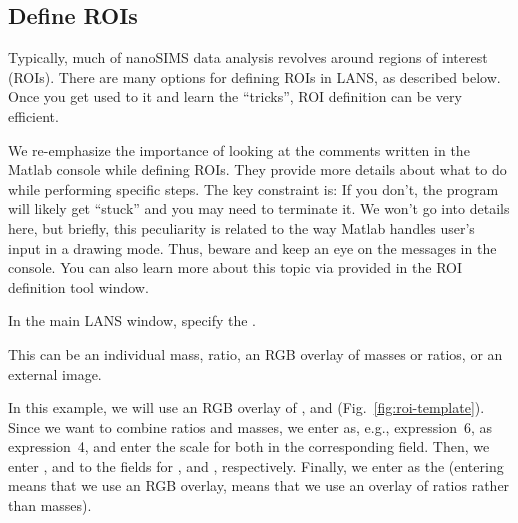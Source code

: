 
\subsection{Define ROIs}
\setcounter{step}{0}

\goldbox{}
Typically, much of nanoSIMS data analysis revolves around regions of interest (ROIs). There are many options for defining ROIs in LANS, as described below. Once you get used to it and learn the ``tricks'', ROI definition can be very efficient. 
\tcbe

\nb
We re-emphasize the importance of looking at the comments written in the Matlab console while defining ROIs. They provide more details about what to do while performing specific steps. The key constraint is:  If you don't, the program will likely get ``stuck'' and you may need to terminate it. We won't go into details here, but briefly, this peculiarity is related to the way Matlab handles user's input in a drawing mode. Thus, beware and keep an eye on the messages in the console. You can also learn more about this topic via  provided in the ROI definition tool window.

\s In the main LANS window, specify the . 

\nb
\bul This can be an individual mass, ratio, an RGB overlay of masses or ratios, or an external image.

\bul In this example, we will use an RGB overlay of ,  and  (Fig.~\ref{fig:roi-template}). Since we want to combine ratios and masses, we enter  as, e.g., expression~6,  as expression~4, and enter the scale for both in the corresponding  field. Then, we enter ,  and  to the fields for ,  and , respectively. Finally, we enter  as the  (entering  means that we use an RGB overlay,  means that we use an overlay of ratios rather than masses).

